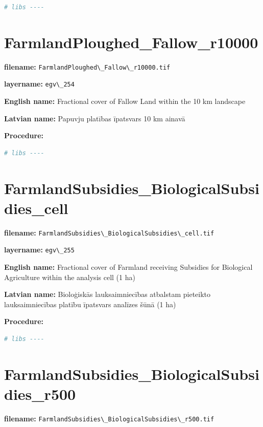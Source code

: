 \documentclass[
]{book}
\newcommand{\passthrough}[1]{#1}
\begin{document}
\begin{lstlisting}[language=R]
# libs ----
\end{lstlisting}

\section{FarmlandPloughed\_Fallow\_r10000}\label{ch06.254}

\textbf{filename:} \passthrough{\lstinline!FarmlandPloughed\_Fallow\_r10000.tif!}

\textbf{layername:} \passthrough{\lstinline!egv\_254!}

\textbf{English name:} Fractional cover of Fallow Land within the 10 km landscape

\textbf{Latvian name:} Papuvju platības īpatsvars 10 km ainavā

\textbf{Procedure:}

\begin{lstlisting}[language=R]
# libs ----
\end{lstlisting}

\section{FarmlandSubsidies\_BiologicalSubsidies\_cell}\label{ch06.255}

\textbf{filename:} \passthrough{\lstinline!FarmlandSubsidies\_BiologicalSubsidies\_cell.tif!}

\textbf{layername:} \passthrough{\lstinline!egv\_255!}

\textbf{English name:} Fractional cover of Farmland receiving Subsidies for Biological Agriculture within the analysis cell (1 ha)

\textbf{Latvian name:} Bioloģiskās lauksaimniecības atbalstam pieteikto lauksaimniecības platību īpatsvars analīzes šūnā (1 ha)

\textbf{Procedure:}

\begin{lstlisting}[language=R]
# libs ----
\end{lstlisting}

\section{FarmlandSubsidies\_BiologicalSubsidies\_r500}\label{ch06.256}

\textbf{filename:} \passthrough{\lstinline!FarmlandSubsidies\_BiologicalSubsidies\_r500.tif!}
\end{document}
